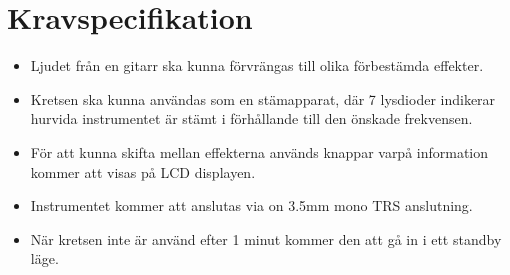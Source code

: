 \documentclass[a4paper]{article}
\begin{document}
\section{Kravspecifikation}

\begin{itemize}
\item Ljudet från en gitarr ska kunna förvrängas till olika förbestämda effekter. 
\item Kretsen ska kunna användas som en stämapparat, där 7 lysdioder indikerar hurvida instrumentet är stämt i förhållande till den önskade frekvensen.
\item För att kunna skifta mellan effekterna används knappar varpå information kommer att visas på LCD displayen.
\item Instrumentet kommer att anslutas via on 3.5mm mono TRS anslutning.
\item När kretsen inte är använd efter 1 minut kommer den att gå in i ett standby läge.
\end{itemize}
\end{document}
